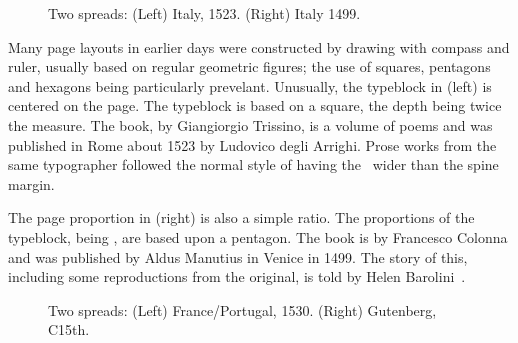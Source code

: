 \documentclass[10pt,letterpaper,extrafontsizes]{memoir}
\begin{document}
\begin{figure}
\centering
\begin{minipage}[b]{\pwlayi}
\end{minipage}
\hfill
\begin{minipage}[b]{\pwlayi}
\end{minipage}
\caption[Two spreads: Italy, 1523 and 1499]%
        {Two spreads: (Left) Italy, 1523.
         (Right) Italy 1499.} \label{fb:8}
\end{figure}

 Many page layouts in earlier days were constructed by
drawing with compass and ruler, usually based on regular geometric figures; 
the use of squares, pentagons and hexagons being particularly
prevelant. Unusually, the typeblock in  (left) 
is centered on the page. The typeblock is based on a 
square, the depth being twice the measure. The book,  by 
Giangiorgio Trissino, is a volume of poems and was published in Rome 
about 1523 by Ludovico degli Arrighi. 
Prose works
from the same typographer followed the normal style of having the \foredge\
wider than the spine margin.

    The page proportion in  (right) is also a simple 
ratio. The proportions of the typeblock, being \ratio{1.7}{1}, 
are based upon a pentagon.
The book is  by Francesco Colonna and was
published by Aldus Manutius\index{Manutius, Aldus} in Venice in 1499. 
The story of this,
including some reproductions from the original, is told by Helen
Barolini~\autocite{BAROLINI92}.


\begin{figure}
\centering
\begin{minipage}[b]{\pwlayi}
\end{minipage}
\hfill
\begin{minipage}[b]{\pwlayi}
\end{minipage}
\caption[Two spreads: France/Portugal, 1530 and Gutenberg, C15th]%
        {Two spreads: (Left) France/Portugal, 1530.
         (Right) Gutenberg, C15th.} \label{fb:9}
\end{figure}
\end{document}
